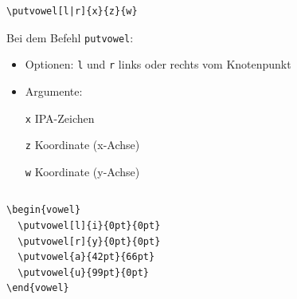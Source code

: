 \begin{frame}[fragile]


\begin{lstlisting}
\putvowel[l|r]{x}{z}{w}
\end{lstlisting}
		
Bei dem Befehl \lstinline|putvowel|:
		
\begin{itemize}
	\item Optionen: \lstinline|l| und \lstinline|r| \ras links oder rechts vom Knotenpunkt
	
	\item Argumente: 
	
	\lstinline|x| \ras IPA-Zeichen
	
	\lstinline|z| \ras Koordinate (x-Achse)

	\lstinline|w| \ras Koordinate (y-Achse)
\end{itemize}


\begin{columns}
	
\begin{column}{.65\textwidth}
{\footnotesize
\begin{lstlisting}
\begin{vowel}
  \putvowel[l]{i}{0pt}{0pt}
  \putvowel[r]{y}{0pt}{0pt}
  \putvowel{a}{42pt}{66pt}
  \putvowel{u}{99pt}{0pt}
\end{vowel}
\end{lstlisting}
}
		
\end{column}
\begin{column}{.35\textwidth}
	
\begin{vowel}
\end{vowel}
	
\end{column}
	
\end{columns}

\end{frame}


